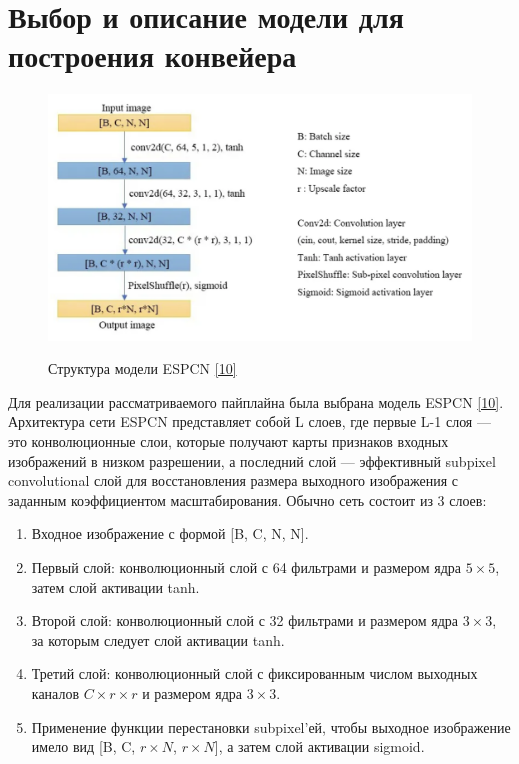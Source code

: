\documentclass[a4paper,14pt]{extreport}
\begin{document}
        \section{Выбор и описание модели для построения конвейера}
        \begin{figure}[!h]
            \begin{center}
                \begin{minipage}[!h]{\linewidth}
                    \includegraphics[width=1\linewidth]{images-pipeline/model.png}
                    \label{ris:netron}
                    \caption{Структура модели ESPCN \hyperlink{[10]}{[10]}}
                \end{minipage}
            \end{center}
        \end{figure}
        
        Для реализации рассматриваемого пайплайна была выбрана модель ESPCN \hyperlink{[10]}{[10]}. Архитектура сети ESPCN представляет собой L слоев, где первые L-1 слоя — это конволюционные слои, которые получают карты признаков входных изображений в низком разрешении, а  последний слой — эффективный subpixel convolutional слой для восстановления размера выходного изображения с заданным коэффициентом масштабирования.
        Обычно сеть состоит из 3 слоев:
        \begin{enumerate}
            \item Входное изображение с формой [B, C, N, N].
            \item Первый слой: конволюционный слой с 64 фильтрами и размером ядра $5 \times 5$, затем слой активации tanh.
            \item Второй слой: конволюционный слой с 32 фильтрами и размером ядра $3 \times 3$, за которым следует слой активации tanh.
            \item Третий слой: конволюционный слой с фиксированным числом выходных каналов $C \times r \times r$ и размером ядра $3 \times 3$.
            \item Применение функции перестановки subpixel'ей, чтобы выходное изображение имело вид [B, C, $r \times N$, $r \times N$], а затем слой активации sigmoid.
        \end{enumerate}
\end{document}
